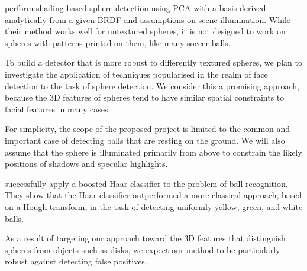 \documentclass[11pt]{scrartcl}
\begin{document}
{        \citet{nillius2008shading} perform shading based sphere detection
        using PCA with a basis derived analytically from a given BRDF and assumptions
        on scene illumination. While their method works well for untextured spheres, it is
        not designed to work on spheres with patterns printed on them, like many
        soccer balls.

        To build a detector that is more robust to differently textured
        spheres, we plan to investigate the application of techniques
        popularised in the realm of face detection to the task of sphere
        detection. We consider this a promising approach, because the 3D
        features of spheres tend to have similar spatial constraints to facial
        features in many cases.

        For simplicity, the scope of the proposed project is limited to the
        common and important case of detecting balls that are resting on the
        ground. We will also assume that the sphere is illuminated primarily
        from above to constrain the likely positions of shadows and specular
        highlights.

        \citet{masselli2013haar} successfully apply a boosted Haar classifier
        \citep{viola2001robust} to the problem of ball recognition. They show
        that the Haar classifier outperformed a more classical approach, based on a
        Hough transform, in the task of detecting uniformly yellow, green, and white
        balls.



        As a result of targeting our approach toward the 3D features that
        distinguish spheres from objects such as disks, we expect our method
        to be particularly robust against detecting false positives.
	}
\end{document}
